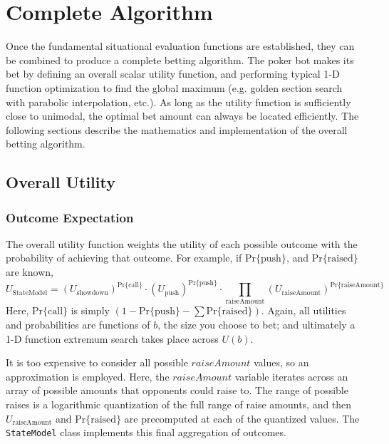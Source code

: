 


\chapter{Complete Algorithm}
\label{sec:CompleteAlgorithm}

Once the fundamental situational evaluation functions are established, they can be combined to produce a complete betting algorithm.
The poker bot makes its bet by defining an overall scalar utility function, and performing typical 1-D function optimization to find the global maximum (e.g. golden section search with parabolic interpolation, etc.).
As long as the utility function is sufficiently close to unimodal, the optimal bet amount can always be located efficiently.
The following sections describe the mathematics and implementation of the overall betting algorithm.

\section{Overall Utility}
\label{sec:OverallUtility}


\subsection{Outcome Expectation}

The overall utility function weights the utility of each possible outcome with the probability of achieving that outcome.
For example, if $\mathrm{Pr\{push}\}$, and $\mathrm{Pr\{raised}\}$ are known, %
\[
U_{\mathrm{StateModel}} = \left(U_{\mathrm{showdown}}\right)^{\mathrm{Pr\{call\}}} \cdot \left(U_{\mathrm{push}}\right)^{\mathrm{Pr\{push}\}} \cdot \prod_{\mathrm{raiseAmount}} \left(U_{\mathrm{raiseAmount}}\right)^{\mathrm{Pr\{raiseAmount}\}}
\]
Here, $\mathrm{Pr\{call\}}$ is simply $\left(1 - \mathrm{Pr\{push}\} - \sum \mathrm{Pr\{raised}\}\right)$.
Again, all utilities and probabilities are functions of $b$, the size you choose to bet; and ultimately a 1-D function extremum search takes place across $U\left(b\right)$.

It is too expensive to consider all possible $raiseAmount$ values, so an approximation is employed.
Here, the $raiseAmount$ variable iterates across an array of possible amounts that opponents could raise to.
The range of possible raises is a logarithmic quantization of the full range of raise amounts, and then $U_{\mathrm{raiseAmount}}$ and $\mathrm{Pr\{raised}\}$ are precomputed at each of the quantized values.
The \texttt{StateModel} class implements this final aggregation of outcomes.

